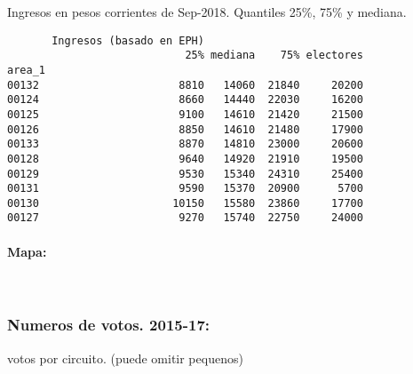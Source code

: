 \documentclass[11pt]{article}
\begin{document}
    
    Ingresos en pesos corrientes de Sep-2018. Quantiles 25\%, 75\% y
mediana.

    
    
    \begin{verbatim}
       Ingresos (basado en EPH)                         
                            25% mediana    75% electores
area_1                                                  
00132                      8810   14060  21840     20200
00124                      8660   14440  22030     16200
00125                      9100   14610  21420     21500
00126                      8850   14610  21480     17900
00133                      8870   14810  23000     20600
00128                      9640   14920  21910     19500
00129                      9530   15340  24310     25400
00131                      9590   15370  20900      5700
00130                     10150   15580  23860     17700
00127                      9270   15740  22750     24000
    \end{verbatim}

    
    \hypertarget{mapa}{%
\paragraph{Mapa:}\label{mapa}}

    
    \begin{center}
    \end{center}
    { \hspace*{\fill} \\}
    
    \hypertarget{numeros-de-votos.-2015-17}{%
\subsubsection{Numeros de votos.
2015-17:}\label{numeros-de-votos.-2015-17}}

    
    votos por circuito. (puede omitir pequenos)

    
    
\end{document}
